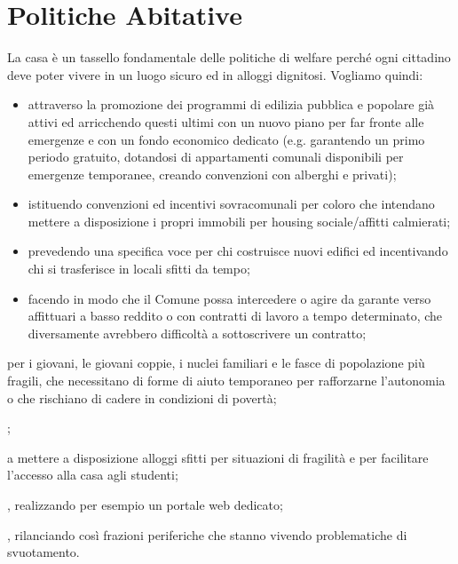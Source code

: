\section{Politiche Abitative}
La casa è un tassello fondamentale delle politiche di welfare perché ogni cittadino deve poter vivere in un luogo sicuro ed in alloggi dignitosi.
Vogliamo quindi:

\begin{bluebox}
\begin{itemize}
  \item attraverso la promozione dei programmi di edilizia pubblica e popolare già attivi ed arricchendo questi ultimi con un nuovo piano per far fronte alle emergenze e con un fondo economico dedicato (e.g. garantendo un primo periodo gratuito, dotandosi di appartamenti comunali disponibili per emergenze temporanee, creando convenzioni con alberghi e privati);
  \pagebreak
  \item istituendo convenzioni ed incentivi sovracomunali per coloro che intendano mettere a disposizione i propri immobili per housing sociale/affitti calmierati;
  \item prevedendo una specifica voce per chi costruisce nuovi edifici ed incentivando chi si trasferisce in locali sfitti da tempo;
  \item facendo in modo che il Comune possa intercedere o agire da garante verso affittuari a basso reddito o con contratti di lavoro a  tempo determinato, che diversamente avrebbero difficoltà a sottoscrivere un contratto;
\end{itemize}
\end{bluebox}

per i giovani, le giovani coppie, i nuclei familiari e le fasce di popolazione più fragili, che necessitano di forme di aiuto temporaneo per rafforzarne l'autonomia o che rischiano di cadere in condizioni di povertà;

;

 a mettere a disposizione alloggi sfitti per situazioni di fragilità e per facilitare l'accesso alla casa agli studenti;

, realizzando per esempio un portale web dedicato;

, rilanciando così frazioni periferiche che stanno vivendo problematiche di svuotamento.
